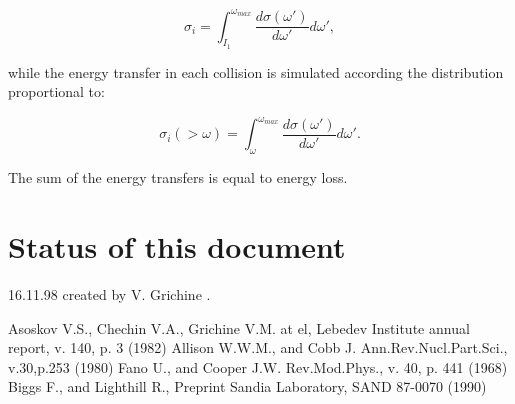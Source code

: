 \[
\sigma_i = \int_{I_1}^{\omega_{max}}\frac{d\sigma(\omega')}{d\omega'}d\omega' ,
\]

while the energy transfer in each collision is simulated according the
distribution proportional to:

\[
\sigma_i(>\omega) = \int_{\omega}^{\omega_{max}}
\frac{d\sigma(\omega')}{d\omega'}d\omega' .
\]

The sum of the energy transfers is equal to energy loss.

\section{Status of  this document}

16.11.98 created by V. Grichine .

\begin{thebibliography}{99}
 Asoskov V.S., Chechin V.A., Grichine V.M. at el,
{Lebedev Institute annual report, v. 140, p. 3} (1982)
 Allison W.W.M., and Cobb J.
{Ann.Rev.Nucl.Part.Sci., v.30,p.253} (1980)
 Fano U., and Cooper J.W.
{Rev.Mod.Phys., v. 40, p. 441} (1968)
 Biggs F., and Lighthill R.,
{Preprint Sandia Laboratory, SAND 87-0070} (1990)
\end{thebibliography}